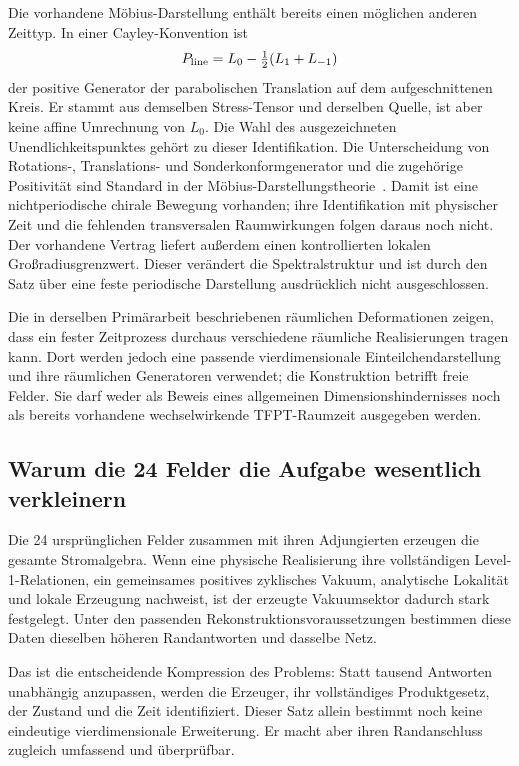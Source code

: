 Die vorhandene Möbius-Darstellung enthält bereits einen möglichen anderen Zeittyp. In einer Cayley-Konvention ist
\begin{equation}
P_{\rm line}=L_0-\tfrac12(L_1+L_{-1})
\end{equation}
der positive Generator der parabolischen Translation auf dem aufgeschnittenen Kreis. Er stammt aus demselben Stress-Tensor und derselben Quelle, ist aber keine affine Umrechnung von $L_0$. Die Wahl des ausgezeichneten Unendlichkeitspunktes gehört zu dieser Identifikation. Die Unterscheidung von Rotations-, Translations- und Sonderkonformgenerator und die zugehörige Positivität sind Standard in der Möbius-Darstellungstheorie~\cite{koesterconformal,morinellirehren}. Damit ist eine nichtperiodische chirale Bewegung vorhanden; ihre Identifikation mit physischer Zeit und die fehlenden transversalen Raumwirkungen folgen daraus noch nicht. Der vorhandene Vertrag  liefert außerdem einen kontrollierten lokalen Großradiusgrenzwert. Dieser verändert die Spektralstruktur und ist durch den Satz über eine feste periodische Darstellung ausdrücklich nicht ausgeschlossen.

Die in derselben Primärarbeit beschriebenen räumlichen Deformationen zeigen, dass ein fester Zeitprozess durchaus verschiedene räumliche Realisierungen tragen kann. Dort werden jedoch eine passende vierdimensionale Einteilchendarstellung und ihre räumlichen Generatoren verwendet; die Konstruktion betrifft freie Felder. Sie darf weder als Beweis eines allgemeinen Dimensionshindernisses noch als bereits vorhandene wechselwirkende TFPT-Raumzeit ausgegeben werden.

\subsection{Warum die 24 Felder die Aufgabe wesentlich verkleinern}
Die 24 ursprünglichen Felder zusammen mit ihren Adjungierten erzeugen die gesamte Stromalgebra. Wenn eine physische Realisierung ihre vollständigen Level-1-Relationen, ein gemeinsames positives zyklisches Vakuum, analytische Lokalität und lokale Erzeugung nachweist, ist der erzeugte Vakuumsektor dadurch stark festgelegt. Unter den passenden Rekonstruktionsvoraussetzungen bestimmen diese Daten dieselben höheren Randantworten und dasselbe Netz.

Das ist die entscheidende Kompression des Problems: Statt tausend Antworten unabhängig anzupassen, werden die Erzeuger, ihr vollständiges Produktgesetz, der Zustand und die Zeit identifiziert. Dieser Satz allein bestimmt noch keine eindeutige vierdimensionale Erweiterung. Er macht aber ihren Randanschluss zugleich umfassend und überprüfbar.

